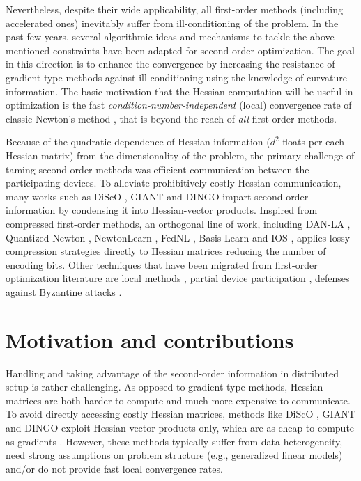 \documentclass[11pt]{article}
\begin{document}
	
	Nevertheless, despite their wide applicability, all first-order methods (including accelerated ones) inevitably suffer from ill-conditioning of the problem. In the past few years, several algorithmic ideas and mechanisms to tackle the above-mentioned constraints have been adapted for second-order optimization. The goal in this direction is to enhance the convergence by increasing the resistance of gradient-type methods against ill-conditioning using the knowledge of curvature information. The basic motivation that the Hessian computation will be useful in optimization is the fast {\em condition-number-independent} (local) convergence rate of classic Newton's method \citep{Beck-book-nonlinear}, that is beyond the reach of {\em all} first-order methods.
	
	Because of the quadratic dependence of Hessian information ($d^2$ floats per each Hessian matrix) from the dimensionality of the problem, the primary challenge of taming second-order methods was efficient communication between the participating devices. To alleviate prohibitively costly Hessian communication, many works such as DiScO \citep{DiScO2015,Zhuang2015,Lin2014LargescaleLR,Newton-MR2019}, GIANT \citep{GIANT2018,DANE,Reddi:2016aide} and DINGO \citep{DINGO,compressesDINGO2020} impart second-order information by condensing it into Hessian-vector products. Inspired from compressed first-order methods, an orthogonal line of work, including DAN-LA \citep{DAN-LA2020}, Quantized Newton \citep{Alimisis2021QNewton}, NewtonLearn \citep{Islamov2021NewtonLearn}, FedNL \citep{FedNL2021}, Basis Learn \citep{qian2021basis} and IOS \citep{IOSFabbro2022}, applies lossy compression strategies directly to Hessian matrices reducing the number of encoding bits. Other techniques that have been migrated from first-order optimization literature are local methods \citep{LocalNewton2021}, partial device participation \citep{FedNL2021,qian2021basis}, defenses against Byzantine attacks \citep{Ghosh2020ByzantineNewton,Ghosh2021ByzantineNewton}.
	
	
	
	\section{Motivation and contributions}
	
	Handling and taking advantage of the second-order information in distributed setup is rather challenging. As opposed to gradient-type methods, Hessian matrices are both harder to compute and much more expensive to communicate. To avoid directly accessing costly Hessian matrices, methods like DiScO \citep{DiScO2015}, GIANT \citep{GIANT2018} and DINGO \citep{DINGO} exploit Hessian-vector products only, which are as cheap to compute as gradients \citep{HessianXvector1994}. However, these methods typically suffer from data heterogeneity, need strong assumptions on problem structure (e.g., generalized linear models) and/or do not provide fast local convergence rates.
	
\end{document}
